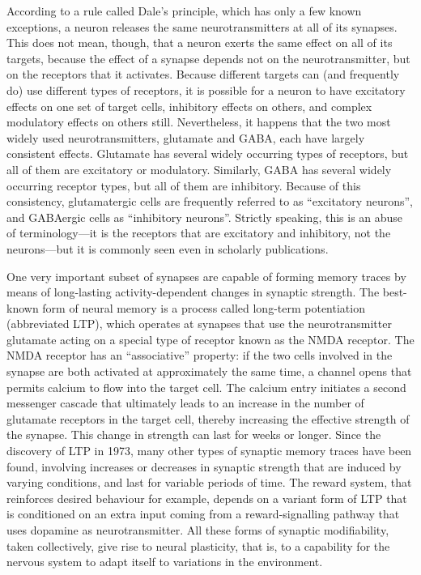 According to a rule called Dale's principle, which has only a few known exceptions, a neuron releases the same neurotransmitters at all of its synapses. This does not mean, though, that a neuron exerts the same effect on all of its targets, because the effect of a synapse depends not on the neurotransmitter, but on the receptors that it activates. Because different targets can (and frequently do) use different types of receptors, it is possible for a neuron to have excitatory effects on one set of target cells, inhibitory effects on others, and complex modulatory effects on others still. Nevertheless, it happens that the two most widely used neurotransmitters, glutamate and GABA, each have largely consistent effects. Glutamate has several widely occurring types of receptors, but all of them are excitatory or modulatory. Similarly, GABA has several widely occurring receptor types, but all of them are inhibitory. Because of this consistency, glutamatergic cells are frequently referred to as ``excitatory neurons'', and GABAergic cells as ``inhibitory neurons''. Strictly speaking, this is an abuse of terminology---it is the receptors that are excitatory and inhibitory, not the neurons---but it is commonly seen even in scholarly publications.

One very important subset of synapses are capable of forming memory traces by means of long-lasting activity-dependent changes in synaptic strength. The best-known form of neural memory is a process called long-term potentiation (abbreviated LTP), which operates at synapses that use the neurotransmitter glutamate acting on a special type of receptor known as the NMDA receptor. The NMDA receptor has an ``associative'' property: if the two cells involved in the synapse are both activated at approximately the same time, a channel opens that permits calcium to flow into the target cell. The calcium entry initiates a second messenger cascade that ultimately leads to an increase in the number of glutamate receptors in the target cell, thereby increasing the effective strength of the synapse. This change in strength can last for weeks or longer. Since the discovery of LTP in 1973, many other types of synaptic memory traces have been found, involving increases or decreases in synaptic strength that are induced by varying conditions, and last for variable periods of time. The reward system, that reinforces desired behaviour for example, depends on a variant form of LTP that is conditioned on an extra input coming from a reward-signalling pathway that uses dopamine as neurotransmitter. All these forms of synaptic modifiability, taken collectively, give rise to neural plasticity, that is, to a capability for the nervous system to adapt itself to variations in the environment.

